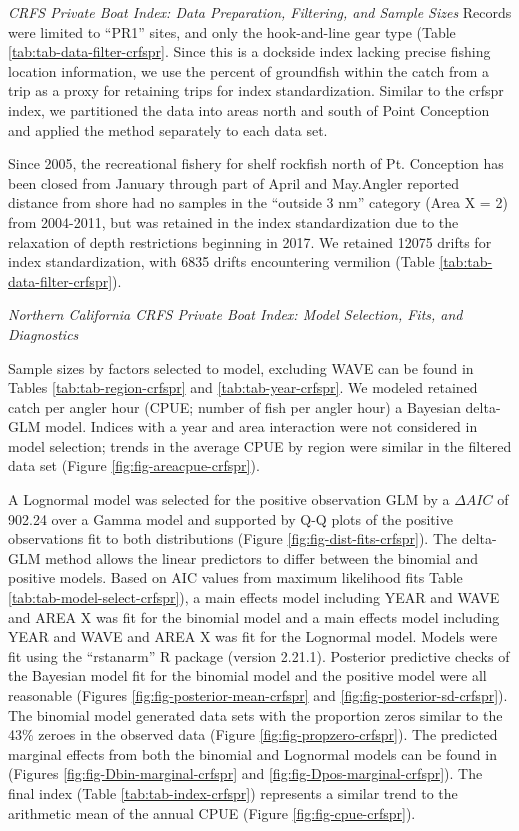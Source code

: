 \documentclass[
  english,
  a4paper,
]{article}
\begin{document}
\emph{CRFS Private Boat Index: Data Preparation, Filtering, and Sample Sizes}
Records were limited to ``PR1'' sites, and only the hook-and-line gear type
(Table \ref{tab:tab-data-filter-crfspr}.
Since this is a dockside index lacking precise fishing location information, we
use the percent of groundfish within the catch from a trip as a proxy for retaining
trips for index standardization. Similar to the crfspr index, we partitioned the
data into areas north and south of Point Conception and applied the method
separately to each data set.

Since 2005, the recreational fishery for shelf rockfish north of Pt. Conception
has been closed from January through part of April and May.Angler reported distance
from shore had no samples in the ``outside 3 nm'' category (Area X = 2)
from 2004-2011, but was retained in the index standardization due to the relaxation
of depth restrictions beginning in 2017. We retained 12075 drifts for index standardization, with 6835 drifts encountering vermilion
(Table \ref{tab:tab-data-filter-crfspr}).

\emph{Northern California CRFS Private Boat Index: Model Selection, Fits, and Diagnostics}

Sample sizes by factors selected to model, excluding WAVE can be found in Tables
\ref{tab:tab-region-crfspr} and \ref{tab:tab-year-crfspr}.
We modeled retained catch per angler hour (CPUE; number of fish per angler hour)
a Bayesian delta-GLM model. Indices with a year and area interaction were not
considered in model selection; trends in the average CPUE by region were similar
in the filtered data set (Figure \ref{fig:fig-areacpue-crfspr}).

A Lognormal model was
selected for the positive observation GLM by
a \(\Delta AIC\) of 902.24 over a Gamma model and supported by Q-Q plots of the positive observations fit to both distributions (Figure \ref{fig:fig-dist-fits-crfspr}). The delta-GLM
method allows the linear predictors to differ between the binomial and positive models.
Based on AIC values from maximum likelihood fits Table \ref{tab:tab-model-select-crfspr}),
a main effects model including
YEAR and WAVE and AREA X
was fit for the binomial model and a main
effects model including
YEAR and WAVE and AREA X
was fit for the Lognormal model.
Models were fit using the ``rstanarm'' R package (version 2.21.1). Posterior predictive
checks of the Bayesian model fit for the binomial model and the positive model
were all reasonable (Figures \ref{fig:fig-posterior-mean-crfspr} and
\ref{fig:fig-posterior-sd-crfspr}). The binomial model generated data sets with the
proportion zeros similar to the 43\% zeroes in the observed data
(Figure \ref{fig:fig-propzero-crfspr}). The predicted marginal effects from
both the binomial and Lognormal models can be found in (Figures \ref{fig:fig-Dbin-marginal-crfspr} and \ref{fig:fig-Dpos-marginal-crfspr}). The
final index (Table \ref{tab:tab-index-crfspr})
represents a similar trend to the arithmetic mean of the annual CPUE (Figure \ref{fig:fig-cpue-crfspr}).
\end{document}
